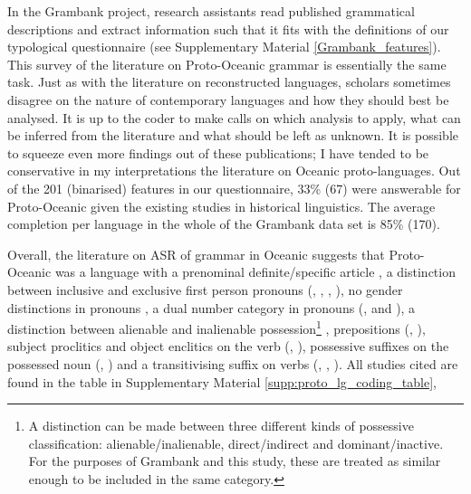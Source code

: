 \documentclass[12pt,letterpaper]{article}
\begin{document}
In the Grambank project, research assistants read published grammatical descriptions and extract information such that it fits with the definitions of our typological questionnaire (see Supplementary Material \ref{Grambank_features}). This survey of the literature on Proto-Oceanic grammar is essentially the same task. Just as with the literature on reconstructed languages, scholars sometimes disagree on the nature of contemporary languages and how they should best be analysed. It is up to the coder to make calls on which analysis to apply, what can be inferred from the literature and what should be left as unknown. It is possible to squeeze even more findings out of these publications; I have tended to be conservative in my interpretations the literature on Oceanic proto-languages. Out of the 201 (binarised) features in our questionnaire, 33\% (67) were answerable for Proto-Oceanic given the existing studies in historical linguistics. The average completion per language in the whole of the Grambank data set is 85\% (170). 

Overall, the literature on ASR of grammar in Oceanic suggests that Proto-Oceanic was a language with a prenominal definite/specific article \citep[136]{crowley1985common}, a distinction between inclusive and exclusive first person pronouns (\citet[112]{pawley1973some}, \citet[184]{crowley1985common}, \citet[500]{ross2004morphosyntactic}, \citet[67, 75]{lynchrosscrowley_proto_grammar_oceanic}), no gender distinctions in pronouns \citep[498]{ross2004morphosyntactic}, a dual number category in pronouns (\citet[498]{ross2004morphosyntactic}, \citet[69]{lynchrosscrowley_proto_grammar_oceanic} and \citet[173]{pawley1973some}), a distinction between alienable and inalienable possession\footnote{A distinction can be made between three different kinds of possessive classification: alienable/inalienable, direct/indirect and dominant/inactive. For the purposes of Grambank and this study, these are treated as similar enough to be included in the same category.} \citep[69]{lynchrosscrowley_proto_grammar_oceanic}, prepositions (\citet[167]{pawley1973some}, \citet[498]{ross2004morphosyntactic}), subject proclitics and object enclitics on the verb (\citet[498-499]{ross2004morphosyntactic}, \citet[83]{lynchrosscrowley_proto_grammar_oceanic}), possessive suffixes on the possessed noun (\citet[495]{ross2004morphosyntactic}, \citet[155]{pawley1973some}) and a transitivising suffix on verbs (\citet[352]{pawley1970change}, \citet[171]{pawley1973some}, \citet[80, 92]{lynchrosscrowley_proto_grammar_oceanic}). All studies cited are found in the table in Supplementary Material \ref{supp:proto_lg_coding_table},
\end{document}
